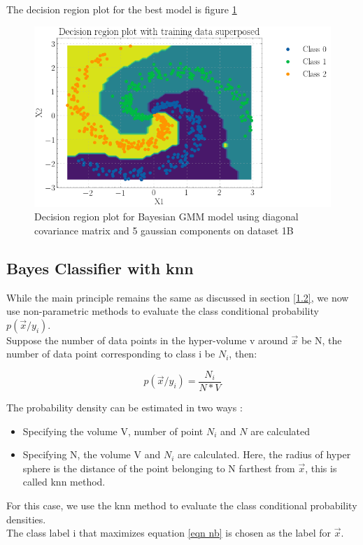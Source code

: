 \documentclass[11pt,a4paper]{article}
\newcommand{\noi}{\noindent}
\begin{document}
The decision region plot for the best model is figure \ref{fig:dec1bGMMdiag}
\begin{figure}[H]
    \centering
    \includegraphics[scale = 0.5]{images/decisionReg_ds2.png}
    \caption{Decision region plot for Bayesian GMM model using diagonal covariance matrix and 5 gaussian components on dataset 1B}
    \label{fig:dec1bGMMdiag}
\end{figure}

\subsection{Bayes Classifier with knn}

While the main principle remains the same as discussed in section \ref{1.2}, we now use non-parametric methods to evaluate the class conditional probability $p(\vec{x}/y_{i})$.
\\Suppose the number of data points in the hyper-volume v around $\vec{x}$ be N, the number of data point corresponding to class i be $N_i$, then:

\begin{equation}
    p(\vec{x}/y_{i})=\frac{N_{i}}{N*V}
\end{equation}

The probability density can be estimated in two ways :

\begin{itemize}
    \item Specifying the volume V, number of point $N_i$ and $N$ are calculated
    \item Specifying N, the volume V and $N_i$ are calculated. Here, the radius of hyper sphere is the distance of the point belonging to N farthest from $\vec{x}$, this is called knn method.  
\end{itemize}
\noi
For this case, we use the knn method to evaluate the class conditional probability densities.
\\ The class label i that maximizes equation \ref{eqn nb} is chosen as the label for $\vec{x}$. 
\end{document}
